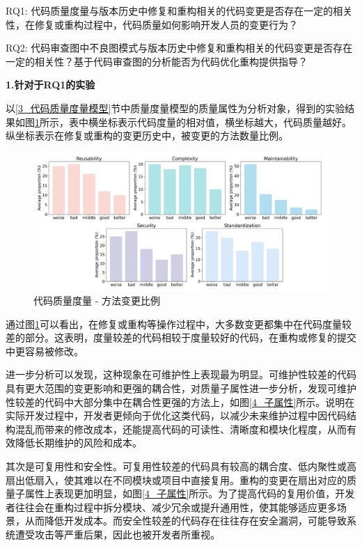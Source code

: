 RQ1: 代码质量度量与版本历史中修复和重构相关的代码变更是否存在一定的相关性，在修复或重构过程中，代码质量如何影响开发人员的变更行为？

RQ2: 代码审查图中不良图模式与版本历史中修复和重构相关的代码变更是否存在一定的相关性？基于代码审查图的分析能否为代码优化重构提供指导？


\textbf{1.针对于RQ1的实验}


以\ref{3_代码质量度量模型}节中质量度量模型的质量属性为分析对象，得到的实验结果如图\ref{1_度量模型分析实验}所示，表中横坐标表示代码度量的相对值，横坐标越大，代码质量越好。纵坐标表示在修复或重构的变更历史中，被变更的方法数量比例。

\begin{figure}[h]
\centering
\includegraphics[width = 1\textwidth]{figures/3_度量实验.png}
\caption{代码质量度量 - 方法变更比例}
\label{1_度量模型分析实验}
\end{figure}


通过图\ref{1_度量模型分析实验}可以看出，在修复或重构等操作过程中，大多数变更都集中在代码度量较差的部分。这表明，度量较差的代码相较于度量较好的代码，在重构或修复的提交中更容易被修改。

进一步分析可以发现，这种现象在可维护性上表现最为明显。可维护性较差的代码具有更大范围的变更影响和更强的耦合性，对质量子属性进一步分析，发现可维护性较差的代码中大部分集中在耦合性更强的方法上，如图\ref{4_子属性}所示。说明在实际开发过程中，开发者更倾向于优化这类代码，以减少未来维护过程中因代码结构混乱而带来的修改成本，还能提高代码的可读性、清晰度和模块化程度，从而有效降低长期维护的风险和成本。

其次是可复用性和安全性。可复用性较差的代码具有较高的耦合度、低内聚性或高扇出低扇入，使其难以在不同模块或项目中直接复用。重构的变更在扇出对应的质量子属性上表现更加明显，如图\ref{4_子属性}所示。为了提高代码的复用价值，开发者往往会在重构过程中拆分模块、减少冗余或提升通用性，使其能够适应更多场景，从而降低开发成本。而安全性较差的代码存在往往存在安全漏洞，可能导致系统遭受攻击等严重后果，因此也被开发者所重视。

